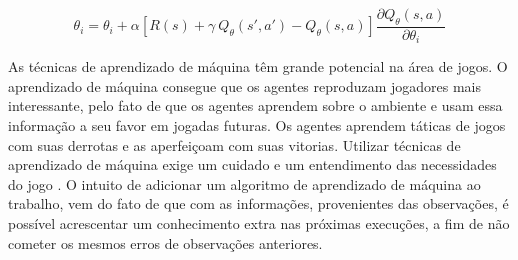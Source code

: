 \begin{equation}
\label{eq:gene}	
\theta_{i} = \theta_{i} + \alpha [R(s) + \gamma~Q_{\theta}(s', a') - Q_{\theta}(s, a)] \frac{\partial Q_{\theta}(s, a)}{\partial \theta_{i}}
\end{equation}


As técnicas de aprendizado de máquina têm grande potencial na área de jogos. O aprendizado de máquina consegue que os agentes reproduzam jogadores mais interessante, pelo fato de que os agentes aprendem sobre o ambiente e usam essa informação a seu favor em jogadas futuras. Os agentes aprendem táticas de jogos com suas derrotas e as aperfeiçoam com suas vitorias. Utilizar técnicas de aprendizado de máquina exige um cuidado e um entendimento das necessidades do jogo \cite{millington2009artificial}. O intuito de adicionar um algoritmo de aprendizado de máquina ao trabalho, vem do fato de que com as informações, provenientes das observações, é possível acrescentar um conhecimento extra nas próximas execuções, a fim de não cometer os mesmos erros de observações anteriores. 

